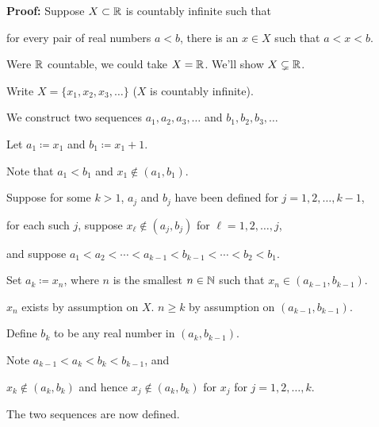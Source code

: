 \documentclass[10pt,aspectratio=149]{beamer}
\begin{document}
\begin{frame}
\textbf{Proof:}
Suppose $X \subset {\mathbb{R}}$ is countably infinite such that

for every pair of real numbers $a < b$, there is an $x \in X$ such that
$a < x < b$.

\pause

Were ${\mathbb{R}}$ countable, we could take $X={\mathbb{R}}$.  \qquad We'll show $X \subsetneq {\mathbb{R}}$.

\medskip
\pause

Write $X = \{ x_1, x_2, x_3, \ldots \}$ \quad ($X$ is countably infinite).

\pause
We construct two sequences
$a_1,a_2,a_3,\ldots$ and
$b_1,b_2,b_3,\ldots$

\pause
Let $a_1 \coloneqq x_1$ and $b_1 \coloneqq x_1+1$.

\pause
Note that $a_1 < b_1$ and $x_1 \notin (a_1,b_1)$.

\pause
Suppose for some $k > 1$, 
$a_{j}$ and $b_{j}$ have been defined for $j=1,2,\ldots,k-1$,

\pause
for each such $j$, suppose $x_\ell \notin (a_{j},b_{j})$ for $\ell=1,2,\ldots,j$,

\pause
and suppose
$a_1 < a_2 < \cdots < a_{k-1} < b_{k-1} < \cdots < b_2 < b_1$.

\medskip
\pause

Set $a_k \coloneqq x_n$, where $n$ is the smallest $n \in {\mathbb{N}}$
such that $x_n \in (a_{k-1},b_{k-1})$.

\pause
$x_n$ exists by assumption on $X$.
\quad $n \geq k$ by assumption on $(a_{k-1},b_{k-1})$.

\pause
Define $b_k$ to be any real number in $(a_k,b_{k-1})$.

\medskip
\pause

Note $a_{k-1} < a_k < b_k < b_{k-1}$, and

\pause
$x_k \notin (a_{k},b_{k})$ and hence
$x_j \notin (a_{k},b_{k})$ 
for $x_j$ for $j=1,2,\ldots,k$.

\pause
The two sequences are now defined.

\end{frame}
\end{document}
